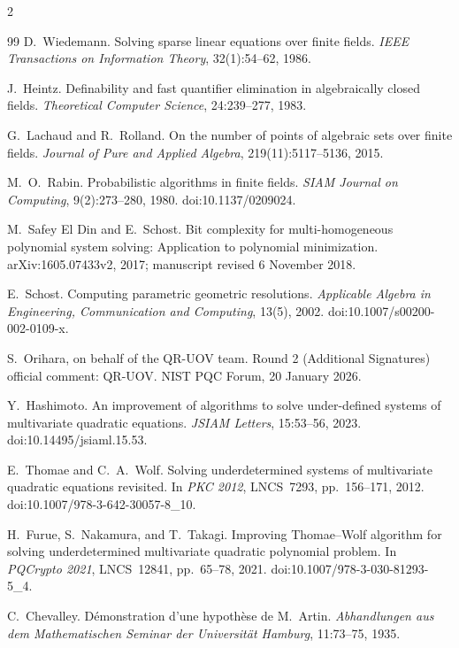 \documentclass[11pt,a4paper]{article}
\theoremstyle{definition}
\theoremstyle{remark}
\begin{document}
\begin{multicols}{2}
\begin{thebibliography}{99}
D.~Wiedemann.
\newblock Solving sparse linear equations over finite fields.
\newblock \emph{IEEE Transactions on Information Theory}, 32(1):54--62, 1986.

J.~Heintz.
\newblock Definability and fast quantifier elimination in algebraically closed fields.
\newblock \emph{Theoretical Computer Science}, 24:239--277, 1983.

G.~Lachaud and R.~Rolland.
\newblock On the number of points of algebraic sets over finite fields.
\newblock \emph{Journal of Pure and Applied Algebra}, 219(11):5117--5136, 2015.


M.~O.~Rabin.
\newblock Probabilistic algorithms in finite fields.
\newblock \emph{SIAM Journal on Computing}, 9(2):273--280, 1980.
\newblock doi:10.1137/0209024.

M.~Safey El Din and E.~Schost.
\newblock Bit complexity for multi-homogeneous polynomial system solving: Application to polynomial minimization.
\newblock arXiv:1605.07433v2, 2017; manuscript revised 6 November 2018.

E.~Schost.
\newblock Computing parametric geometric resolutions.
\newblock \emph{Applicable Algebra in Engineering, Communication and Computing}, 13(5), 2002.
\newblock doi:10.1007/s00200-002-0109-x.

S.~Orihara, on behalf of the QR-UOV team.
\newblock Round 2 (Additional Signatures) official comment: QR-UOV.
\newblock NIST PQC Forum, 20 January 2026.

Y.~Hashimoto.
\newblock An improvement of algorithms to solve under-defined systems of multivariate quadratic equations.
\newblock \emph{JSIAM Letters}, 15:53--56, 2023.
\newblock doi:10.14495/jsiaml.15.53.

E.~Thomae and C.~A.~Wolf.
\newblock Solving underdetermined systems of multivariate quadratic equations revisited.
\newblock In \emph{PKC 2012}, LNCS~7293, pp.~156--171, 2012.
\newblock doi:10.1007/978-3-642-30057-8\_10.

H.~Furue, S.~Nakamura, and T.~Takagi.
\newblock Improving Thomae--Wolf algorithm for solving underdetermined multivariate quadratic polynomial problem.
\newblock In \emph{PQCrypto 2021}, LNCS~12841, pp.~65--78, 2021.
\newblock doi:10.1007/978-3-030-81293-5\_4.

C.~Chevalley.
\newblock D\'emonstration d'une hypoth\`ese de M.~Artin.
\newblock \emph{Abhandlungen aus dem Mathematischen Seminar der Universit\"at Hamburg}, 11:73--75, 1935.


\end{thebibliography}
\end{multicols}
\end{document}

